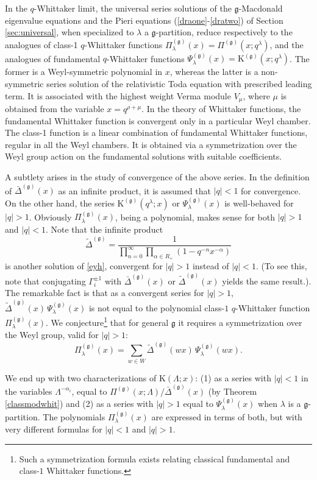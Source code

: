 \documentclass[12pt]{amsart}
\newcommand{\g}{{\mathfrak{g}}}
\newcommand{\al}{{\alpha}}
\newcommand{\lL}{{\Lambda}}
\numberwithin{equation}{section}
\begin{document}
In the $q$-Whittaker limit, the universal series solutions of the $\g$-Macdonald eigenvalue equations and the Pieri equations (\ref{draone}-\ref{dratwo}) of Section \ref{sec:universal},
when specialized to $\lambda$ a $\g$-partition, reduce respectively to the analogues of 
class-1 $q$-Whittaker functions $\Pi_\lambda^{(\g)}(x)=\Pi^{(\g)}(x;q^\lambda)$, and the analogues of fundamental
$q$-Whittaker functions
$\Psi_\lambda^{(\g)}(x)=\mathrm K^{(\g)}(x;q^\lambda)$. The former is a Weyl-symmetric polynomial in $x$, whereas the latter is a non-symmetric series solution of the relativistic Toda equation with prescribed leading term. It is associated with the highest weight Verma module $V_\mu$, where $\mu$ is obtained from the variable $x=q^{\rho+\mu}$.
In the theory of Whittaker functions, the fundamental Whittaker function is convergent only in a particular Weyl chamber. The class-1 function is a linear combination of fundamental Whittaker functions, regular in all the Weyl chambers.
It is  obtained via a symmetrization over the Weyl group action on the fundamental solutions with suitable coefficients.

A subtlety arises in the study of convergence of the above series. In the definition of $\bar\Delta^{(\g)}(x)$ as an infinite product, it is assumed that $|q|<1$ for convergence.
%
%
%
On the other hand, the series $\mathrm K^{(\g)}(q^\lambda;x)$ or $\Psi_\lambda^{(\g)}(x)$ is well-behaved for $|q|>1$.
Obviously $\Pi_\lambda^{(\g)}(x)$, being a polynomial, makes sense for both $|q|>1$ and $|q|<1$. 
Note that the infinite product
$$\tilde \Delta^{(\g)}=\frac{1}{\prod_{n=0}^\infty \prod_{\al\in R_+} (1-q^{-n} x^{-\al})} $$
is another solution of \eqref{eyh}, convergent for $|q|>1$ instead of $|q|<1$. (To see this, note that conjugating 
$\Gamma_i^{\pm 1}$ with $\bar \Delta^{(\g)}(x)$ or $\tilde \Delta^{(\g)}(x)$ yields the same result.). The remarkable fact is that as a convergent series for $|q|>1$, 
$\tilde \Delta^{(\g)}(x)\, \Psi_\lambda^{(\g)}(x)$ is not equal to the polynomial class-$1$ $q$-Whittaker function $\Pi_\lambda^{(\g)}(x)$. We conjecture\footnote{Such a symmetrization formula exists relating classical fundamental and class-$1$ Whittaker functions.} that for general $\g$ 
it requires a symmetrization over the Weyl group, valid for $|q|>1$:
\begin{equation} \label{conjsym}
\Pi_\lambda^{(\g)}(x) =\sum_{w\in W} \tilde \Delta^{(\g)}(wx)\, \Psi_\lambda^{(\g)}(wx).
\end{equation}

We end up with two characterizations of $\mathrm K(\lL;x)$: (1) as a series with $|q|<1$ in the variables $\lL^{-\al_i}$, equal to $\Pi^{(\g)}(x;\lL)/\bar \Delta^{(\g)}(x)$
(by Theorem \ref{classmodwhit}) and (2) as a series with $|q|>1$ equal to $ \Psi_\lambda^{(\g)}(x)$ when $\lambda$ is a $\g$-partition. The polynomials $\Pi_\lambda^{(\g)}(x)$ are expressed in terms of both, but with very different formulas for $|q|<1$ and $|q|>1$.
\end{document}
